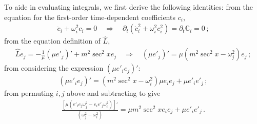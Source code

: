 \documentclass[letterpaper,11pt]{article}
\newcommand{\p}{\partial}
\newcommand{\oi}{\omega_i}
\newcommand{\oj}{\omega_j}
\begin{document}
To aide in evaluating integrals, we first derive the following identities: from the equation for the first-order time-dependent coefficients $c_i$,
\begin{align} 
\ddot c_i + \oi^2 c_i = 0 \quad \Rightarrow \quad \p_t \left(\dot c_i^2 + \oi^2 c_i^2 \right) = \p_t \mathbb C_i = 0 \, ;
\end{align}
from the equation definition of $\hat L$,
\begin{align}
\hat L e_j = -\frac{1}{\mu} \left( \mu e'_j \right)' + m^2 \sec^2 x e_j \quad \Rightarrow \quad \left( \mu e'_j \right)' = \mu \left( m^2 \sec^2 x - \omega_j^2 \right) e_j \, ;
\end{align}
from considering the expression $\left( \mu e'_i e_j \right)'$:
\begin{align}
\left( \mu e'_i e_j \right) ' = \left(m^2 \sec^2 x - \oi^2 \right) \mu e_i e_j + \mu e'_i e'_j \, ;
\end{align}
from permuting $i, j$ above and subtracting to give
\begin{align}
\frac{\left[ \mu (e'_i e_j \oj^2 - e_i e'_j \oi^2 ) \right]'}{(\oj^2 - \oi^2)} = \mu m^2 \sec^2 x e_i e_j + \mu e'_i e'_j \, .
\end{align}

\end{document}
